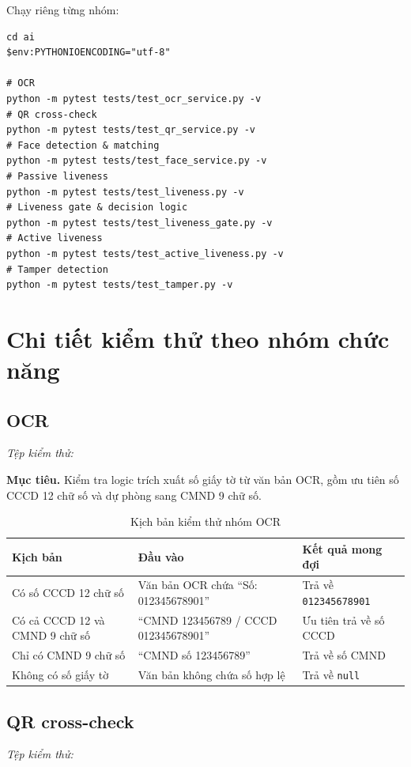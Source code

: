 \documentclass[12pt,a4paper]{article}
\begin{document}
Chạy riêng từng nhóm:
\begin{lstlisting}
cd ai
$env:PYTHONIOENCODING="utf-8"

# OCR
python -m pytest tests/test_ocr_service.py -v
# QR cross-check
python -m pytest tests/test_qr_service.py -v
# Face detection & matching
python -m pytest tests/test_face_service.py -v
# Passive liveness
python -m pytest tests/test_liveness.py -v
# Liveness gate & decision logic
python -m pytest tests/test_liveness_gate.py -v
# Active liveness
python -m pytest tests/test_active_liveness.py -v
# Tamper detection
python -m pytest tests/test_tamper.py -v
\end{lstlisting}

\section{Chi tiết kiểm thử theo nhóm chức năng}
\subsection{OCR}
\textit{Tệp kiểm thử:} 

\textbf{Mục tiêu.} Kiểm tra logic trích xuất số giấy tờ từ văn bản OCR, gồm ưu tiên số CCCD 12 chữ số và
dự phòng sang CMND 9 chữ số.

\begin{table}[H]
  \centering
  \caption{Kịch bản kiểm thử nhóm OCR}
  \label{tab:ocr-results}
  \small
  \begin{tabular}{@{}p{4.2cm}p{5.6cm}p{4.2cm}@{}}
    \toprule
    \textbf{Kịch bản} & \textbf{Đầu vào} & \textbf{Kết quả mong đợi}\\
    \midrule
    Có số CCCD 12 chữ số & Văn bản OCR chứa ``Số: 012345678901'' & Trả về \texttt{012345678901}\\
    Có cả CCCD 12 và CMND 9 chữ số & ``CMND 123456789 / CCCD 012345678901'' & Ưu tiên trả về số CCCD\\
    Chỉ có CMND 9 chữ số & ``CMND số 123456789'' & Trả về số CMND\\
    Không có số giấy tờ & Văn bản không chứa số hợp lệ & Trả về \texttt{null}\\
    \bottomrule
  \end{tabular}
\end{table}

\subsection{QR cross-check}
\textit{Tệp kiểm thử:} 
\end{document}
